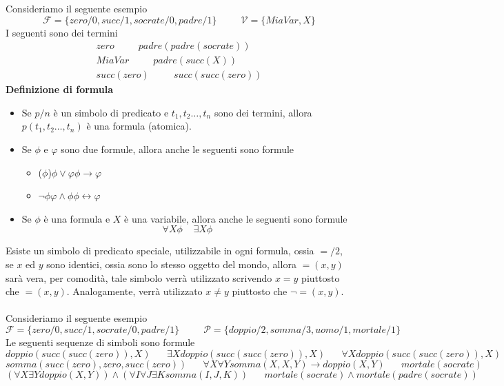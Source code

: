 \documentclass[12pt, letterpaper]{article}
\newcommand{\acc}{\\\hphantom{}\\}
\newcommand{\V}{{\mathcal{V} }}
\newcommand{\F}{{\mathcal{F} }}
\newcommand{\Pred}{{\mathcal{P} }}
\begin{document}
Consideriamo il seguente esempio $$\F = \{zero/0,succ/1,socrate/0,padre/1\}\;\;\;\;\;\;\;\;\;\V=\{MiaVar, X\} $$
I seguenti sono dei termini 
$$ \begin{matrix}
    zero\;\;\;\;\;\;\;\;\;padre(padre(socrate))\\ 
    MiaVar\;\;\;\;\;\;\;\;\;padre(succ(X))\\ 
    succ(zero)\;\;\;\;\;\;\;\;\;succ(succ(zero))
\end{matrix}$$
\textbf{Definizione di formula}\begin{itemize}
    \item Se $p/n$ è un simbolo di predicato e  $t_1,t_2\dots,t_n$ sono dei termini, 
    allora  $p(t_1,t_2\dots,t_n)$ è una formula (atomica).
    \item Se $\phi$ e $\varphi$ sono due formule, allora anche le seguenti sono formule\begin{itemize}
        \item ($\phi$)\hphantom{spaziospazio}$\phi\lor\varphi$\hphantom{spaziospazio}$\phi\rightarrow\varphi$
        \item  $\lnot\phi$\hphantom{spaziospazio}$\varphi\land\phi$\hphantom{spaziospazio}$\phi\leftrightarrow\varphi$
    \end{itemize}
    \item Se $\phi$ è una formula e $X$ è una variabile, allora anche le seguenti sono formule
     $$\forall X \phi\;\;\;\; \exists X \phi$$ 
\end{itemize}
Esiste un simbolo di predicato speciale, utilizzabile in ogni formula, ossia $=/2$, se $x$ ed $y$ sono identici, 
ossia sono lo stesso oggetto del mondo, allora $=(x,y)$ sarà vera, per comodità, tale simbolo verrà utilizzato 
scrivendo $x=y$ piuttosto che $=(x,y)$. Analogamente, verrà utilizzato $x\ne y$ piuttosto che $\lnot=(x,y)$.\acc 
Consideriamo il seguente esempio
$$\F = \{zero/0,succ/1,socrate/0,padre/1\}\;\;\;\;\;\;\;\;\;\Pred=\{doppio/2,somma/3, uomo/1, mortale/1\}$$
Le seguenti sequenze di simboli sono formule 
$$doppio(succ(succ(zero)), X)\;\;\;\;\;\;\exists X doppio(succ(succ(zero)), X)\;\;\;\;\;\;\forall X doppio(succ(succ(zero)), X)$$
$$somma(succ(zero), zero,succ(zero))\;\;\;\;\;\;\forall X\forall Y somma(X, X, Y ) → doppio(X, Y ) \;\;\;\;\;\;mortale(socrate)$$
$$(\forall X\exists Y doppio(X,Y )) \land  (\forall I \forall J\exists K somma(I,J,K))\;\;\;\;\;\;mortale(socrate) \land mortale(padre(socrate)) $$
\end{document}
